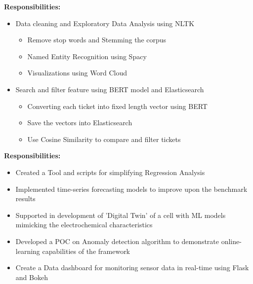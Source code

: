 \documentclass[10pt,a4paper,ragged2e,withhyper]{altacv}
\begin{document}
            \smallskip
            \textbf{Responsibilities:}\\
            \vspace{0.5em}
            \begin{itemize}
                \item Data cleaning and Exploratory Data Analysis using NLTK
                    \begin{itemize}
                        \item Remove stop words and Stemming the corpus
                        \item Named Entity Recognition using Spacy
                        \item Visualizations using Word Cloud
                    \end{itemize}
                \item Search and filter feature using BERT model and Elasticsearch
                \begin{itemize}
                    \item Converting each ticket into fixed length vector using BERT
                    \item Save the vectors into Elasticsearch
                    \item Use Cosine Similarity to compare and filter tickets
                \end{itemize}
            \end{itemize}
            \divider

            \smallskip
            \textbf{Responsibilities:}\\
            \vspace{0.5em}
            \begin{itemize}
                \item Created a Tool and scripts for simplifying Regression Analysis
                \item Implemented time-series forecasting models to improve upon the benchmark results
                \item Supported in development of 'Digital Twin' of a cell with ML models mimicking the electrochemical characteristics
                \item Developed a POC on Anomaly detection algorithm to demonstrate online-learning capabilities of the framework
                \item Create a Data dashboard for monitoring sensor data in real-time using Flask and Bokeh
            \end{itemize}
            \divider
\end{document}
